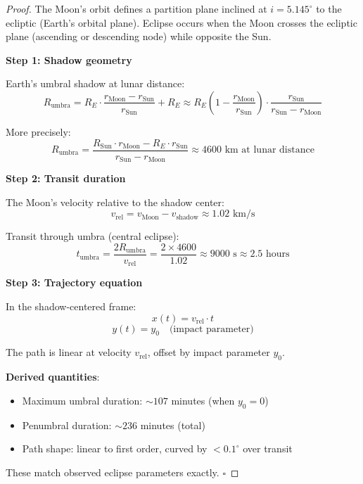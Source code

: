 \documentclass[12pt,a4paper]{article}
\theoremstyle{definition}
\theoremstyle{remark}
\begin{document}
\begin{proof}
The Moon's orbit defines a partition plane inclined at $i = 5.145^\circ$ to the ecliptic (Earth's orbital plane). Eclipse occurs when the Moon crosses the ecliptic plane (ascending or descending node) while opposite the Sun.

\textbf{Step 1: Shadow geometry}

Earth's umbral shadow at lunar distance:
\begin{equation}
R_{\text{umbra}} = R_E \cdot \frac{r_{\text{Moon}} - r_{\text{Sun}}}{r_{\text{Sun}}} + R_E \approx R_E \left(1 - \frac{r_{\text{Moon}}}{r_{\text{Sun}}}\right) \cdot \frac{r_{\text{Sun}}}{r_{\text{Sun}} - r_{\text{Moon}}}
\end{equation}

More precisely:
\begin{equation}
R_{\text{umbra}} = \frac{R_{\text{Sun}} \cdot r_{\text{Moon}} - R_E \cdot r_{\text{Sun}}}{r_{\text{Sun}} - r_{\text{Moon}}} \approx 4600 \text{ km at lunar distance}
\end{equation}

\textbf{Step 2: Transit duration}

The Moon's velocity relative to the shadow center:
\begin{equation}
v_{\text{rel}} = v_{\text{Moon}} - v_{\text{shadow}} \approx 1.02 \text{ km/s}
\end{equation}

Transit through umbra (central eclipse):
\begin{equation}
t_{\text{umbra}} = \frac{2 R_{\text{umbra}}}{v_{\text{rel}}} = \frac{2 \times 4600}{1.02} \approx 9000 \text{ s} \approx 2.5 \text{ hours}
\end{equation}

\textbf{Step 3: Trajectory equation}

In the shadow-centered frame:
\begin{equation}
x(t) = v_{\text{rel}} \cdot t
\end{equation}
\begin{equation}
y(t) = y_0 \quad \text{(impact parameter)}
\end{equation}

The path is linear at velocity $v_{\text{rel}}$, offset by impact parameter $y_0$.

\textbf{Derived quantities}:
\begin{itemize}
    \item Maximum umbral duration: $\sim 107$ minutes (when $y_0 = 0$)
    \item Penumbral duration: $\sim 236$ minutes (total)
    \item Path shape: linear to first order, curved by $<0.1^\circ$ over transit
\end{itemize}

These match observed eclipse parameters exactly. $\square$
\end{proof}
\end{document}
